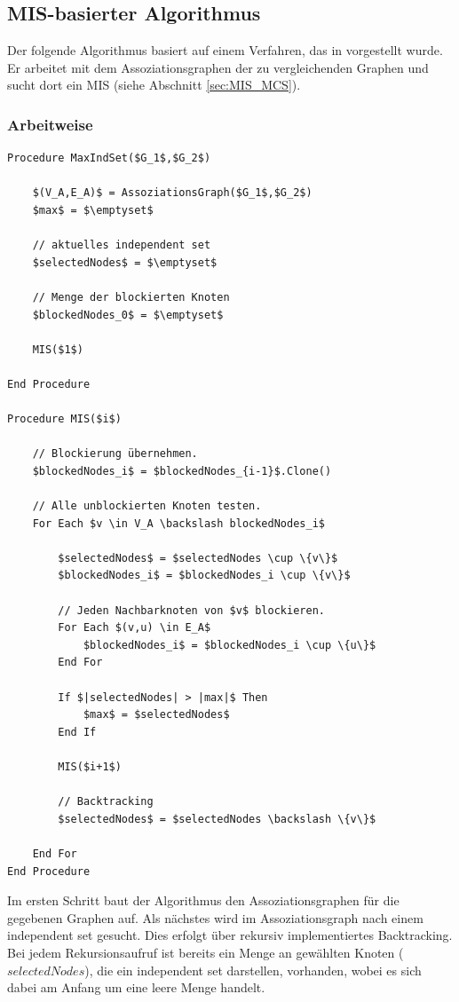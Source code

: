 \subsection{MIS-basierter Algorithmus}
Der folgende Algorithmus basiert auf einem Verfahren, das in \cite{MaxCSwitMaxIS} 
vorgestellt wurde. Er arbeitet mit dem Assoziationsgraphen der zu 
vergleichenden Graphen und sucht dort ein MIS (siehe Abschnitt \ref{sec:MIS_MCS}). 


\subsubsection{Arbeitweise}
\begin{lstlisting}[float=htbp,caption={MIS-basierter Algorithmus},label={lst:MIS}]
Procedure MaxIndSet($G_1$,$G_2$)

    $(V_A,E_A)$ = AssoziationsGraph($G_1$,$G_2$)
    $max$ = $\emptyset$ 
    
    // aktuelles independent set
    $selectedNodes$ = $\emptyset$
    
    // Menge der blockierten Knoten
    $blockedNodes_0$ = $\emptyset$
    
    MIS($1$)
    
End Procedure

Procedure MIS($i$)

    // Blockierung übernehmen.
    $blockedNodes_i$ = $blockedNodes_{i-1}$.Clone()
    
    // Alle unblockierten Knoten testen.
    For Each $v \in V_A \backslash blockedNodes_i$
    
        $selectedNodes$ = $selectedNodes \cup \{v\}$
        $blockedNodes_i$ = $blockedNodes_i \cup \{v\}$
    
        // Jeden Nachbarknoten von $v$ blockieren.
        For Each $(v,u) \in E_A$
            $blockedNodes_i$ = $blockedNodes_i \cup \{u\}$
        End For
        
        If $|selectedNodes| > |max|$ Then
            $max$ = $selectedNodes$
        End If
        
        MIS($i+1$)
        
        // Backtracking
        $selectedNodes$ = $selectedNodes \backslash \{v\}$
       
    End For
End Procedure
\end{lstlisting}

Im ersten Schritt baut der Algorithmus den Assoziationsgraphen für die gegebenen 
Graphen auf. Als nächstes wird im Assoziationsgraph nach einem independent set 
gesucht. Dies erfolgt über rekursiv implementiertes Backtracking. Bei jedem 
Rekursionsaufruf ist bereits ein Menge an gewählten Knoten ($selectedNodes$), 
die ein independent set darstellen, vorhanden, wobei es sich 
dabei am Anfang um eine leere Menge handelt.

